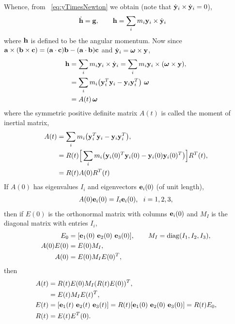 Whence, from ~\eqref{eq:yTimesNewton} we obtain (note that $\dot{\mathbf{ y}}_i\times\dot{\mathbf{ y}}_i=0$), 
\begin{align*}
     \dot {\mathbf{ h}} &= \mathbf{ g} , \qquad   \mathbf{ h} = \sum_i m_i \mathbf{ y}_i\times \dot {\mathbf{ y}}_i
\end{align*}
where $\mathbf{ h}$ is defined to be the angular momentum. Now since $\mathbf{ a}\times(\mathbf{ b}\times{\mathbf c}) =(\mathbf{ a}\cdot{\mathbf c})\mathbf{ b} - (\mathbf{ a}\cdot\mathbf{ b}){\mathbf c}$
and $\dot{\mathbf{ y}}_i = \boldsymbol{\omega}\times\mathbf{ y}$, 
\begin{align*}
   \mathbf{ h} &= \sum_i m_i \mathbf{ y}_i\times \dot {\mathbf{ y}}_i = \sum_i m_i \mathbf{ y}_i\times( \boldsymbol{\omega}\times\mathbf{ y}), \\
       &= \sum_i m_i \big(  \mathbf{ y}_i^T\mathbf{ y}_i - \mathbf{ y}_i\mathbf{ y}_i^T\big) ~\boldsymbol{\omega} \\
       &= A(t)\, \boldsymbol{\omega} 
\end{align*}
where the symmetric positive definite matrix $A(t)$ is called the moment of inertial matrix,
\begin{align*}
  A(t) &= \sum_i m_i \big(  \mathbf{ y}_i^T\mathbf{ y}_i - \mathbf{ y}_i\mathbf{ y}_i^T \big), \\
      &= R(t) \Big[ \sum_i m_i \big(  \mathbf{ y}_i(0)^T\mathbf{ y}_i(0)  - \mathbf{ y}_i(0)\mathbf{ y}_i(0)^T\big) \Big] R^T(t),  \\
       &= R(t) A(0) R^T(t)
\end{align*}
If $A(0)$ has eigenvalues $I_i$ and eigenvectors $\mathbf{ e}_i(0)$ (of unit length), 
\begin{align*}
   A(0)\mathbf{ e}_i(0) = I_i \mathbf{ e}_i(0), ~~i=1,2,3, 
\end{align*}
then if $E(0)$ is the orthonormal matrix with columns $\mathbf{ e}_i(0)$ and $M_I$ is the diagonal matrix with entries $I_i$, 
\begin{align*}
   E_0 &= [\mathbf{ e}_1(0)~ \mathbf{ e}_2(0)~ \mathbf{ e}_3(0)], \qquad  M_I = {\rm diag}(I_1,I_2,I_3) , \\
   A(0)E(0) &= E(0) M_I, \\
   A(0) &= E(0) M_I E(0)^T , 
\end{align*}
then
\begin{align*}
  A(t) &= R(t)E(0) M_I (R(t)E(0))^T, \\
       &= E(t) M_I E(t)^T,   \\
  E(t) &=[\mathbf{ e}_1(t)~ \mathbf{ e}_2(t)~ \mathbf{ e}_3(t)] = R(t) [\mathbf{ e}_1(0)~ \mathbf{ e}_2(0)~ \mathbf{ e}_3(0)] = R(t) E_0, \\
    R(t)& = E(t)E^T(0).
\end{align*}

